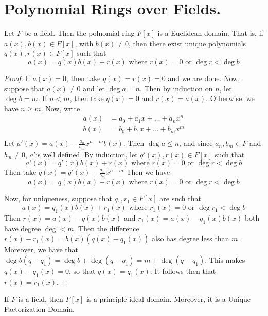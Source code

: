 \section{Polynomial Rings over Fields.}

\begin{theorem}\label{3.4.1}
    Let $F$ be a field. Then the polnomial ring $F[x]$ is a Euclidean domain.
    That is, if $a(x),b(x) \in F[x]$, with $b(x) \neq 0$, then there exist
    unique polynomials $q(x), r(x) \in F[x]$ such that
    \begin{equation*}
        a(x)=q(x)b(x)+r(x) \text{ where } r(x)=0 \text{ or } \deg{r}<\deg{b}
    \end{equation*}
\end{theorem}
\begin{proof}
    If $a(x)=0$, then take $q(x)=r(x)=0$ and we are done. Now, suppose that
    $a(x) \neq 0$ and let $\deg{a}=n$. Then by induction on $n$, let
    $\deg{b}=m$. If $n<m$, then take  $q(x)=0$ and $r(x)=a(x)$. Otherwise, we
    have $n \geq m$. Now, write
    \begin{align*}
        a(x)    &=  a_0+a_1x+\dots+a_nx^n   \\
        b(x)    &=  b_0+b_1x+\dots+b_mx^m   \\
    \end{align*}
    Let $a'(x)=a(x)-\frac{a_n}{b_m}x^{n-m}b(x)$. Then $\deg{a} \leq n$, and
    since $a_n,b_m \in F$ and  $b_m \neq 0$,  $a'$is well defined. By induction,
    let  $q'(x),r(x) \in F[x]$ such that
    \begin{equation*}
        a'(x)=q'(x)b(x)+r(x) \text{ where } r(x)=0 \text{ or } \deg{r}<\deg{b}
    \end{equation*}
    Then take $q(x)=q'(x)-\frac{a_n}{b_m}x^{n-m}$ Then we have
    \begin{equation*}
        a(x)=q(x)b(x)+r(x) \text{ where } r(x)=0 \text{ or } \deg{r}<\deg{b}
    \end{equation*}

    Now, for uniqueness, suppose that $q_1,r_1 \in F[x]$ are such that
    \begin{equation*}
        a(x)=q_1(x)b(x)+r_1(x) \text{ where } r_1(x)=0 \text{ or } \deg{r_1}<\deg{b}
    \end{equation*}
    Then $r(x)=a(x)-q(x)b(x)$ and $r_1(x)=a(x)-q_1(x)b(x)$ both have degree
    $\deg<m$. Then the difference  $r(x)-r_1(x)=b(x)(q(x)-q_1(x))$ also has
    degree less than $m$. Moreover, we have that
    $\deg{b(q-q_1)}=\deg{b}+\deg{(q-q_1)}=m+\deg{(q-q_1)}$. This makes
    $q(x)-q_1(x)=0$, so that $q(x)=q_1(x)$. It follows then that $r(x)=r_1(x)$.
\end{proof}
\begin{corollary}
    If $F$ is a field, then $F[x]$ is a principle ideal domain. Moreover, it is
    a Unique Factorization Domain.
\end{corollary}

